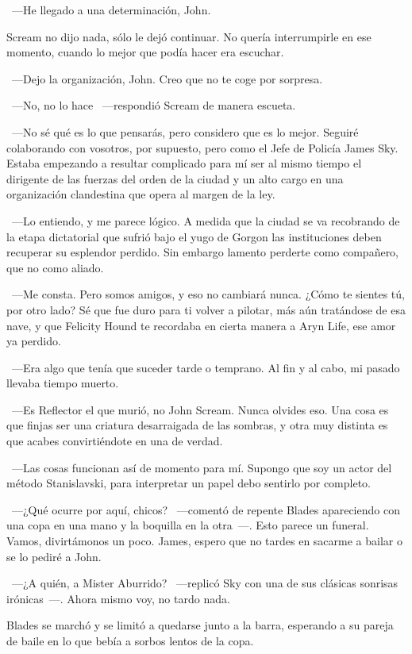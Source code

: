 ~---He llegado a una determinación, John.

Scream no dijo nada, sólo le dejó continuar. No quería interrumpirle en ese momento, cuando lo mejor que podía hacer era escuchar.

~---Dejo la organización, John. Creo que no te coge por sorpresa.

~---No, no lo hace ~---respondió Scream de manera escueta.

~---No sé qué es lo que pensarás, pero considero que es lo mejor. Seguiré colaborando con vosotros, por supuesto, pero como el Jefe de Policía James Sky. Estaba empezando a resultar complicado para mí ser al mismo tiempo el dirigente de las fuerzas del orden de la ciudad y un alto cargo en una organización clandestina que opera al margen de la ley.

~---Lo entiendo, y me parece lógico. A medida que la ciudad se va recobrando de la etapa dictatorial que sufrió bajo el yugo de Gorgon las instituciones deben recuperar su esplendor perdido. Sin embargo lamento perderte como compañero, que no como aliado.

~---Me consta. Pero somos amigos, y eso no cambiará nunca. ¿Cómo te sientes tú, por otro lado? Sé que fue duro para ti volver a pilotar, más aún tratándose de esa nave, y que Felicity Hound te recordaba en cierta manera a Aryn Life, ese amor ya perdido.

~---Era algo que tenía que suceder tarde o temprano. Al fin y al cabo, mi pasado llevaba tiempo muerto.

~---Es Reflector el que murió, no John Scream. Nunca olvides eso. Una cosa es que finjas ser una criatura desarraigada de las sombras, y otra muy distinta es que acabes convirtiéndote en una de verdad.

~---Las cosas funcionan así de momento para mí. Supongo que soy un actor del método Stanislavski, para interpretar un papel debo sentirlo por completo.

~---¿Qué ocurre por aquí, chicos? ~---comentó de repente Blades apareciendo con una copa en una mano y la boquilla en la otra~---. Esto parece un funeral. Vamos, divirtámonos un poco. James, espero que no tardes en sacarme a bailar o se lo pediré a John.

~---¿A quién, a Mister Aburrido? ~---replicó Sky con una de sus clásicas sonrisas irónicas~---. Ahora mismo voy, no tardo nada.

Blades se marchó y se limitó a quedarse junto a la barra, esperando a su pareja de baile en lo que bebía a sorbos lentos de la copa.


